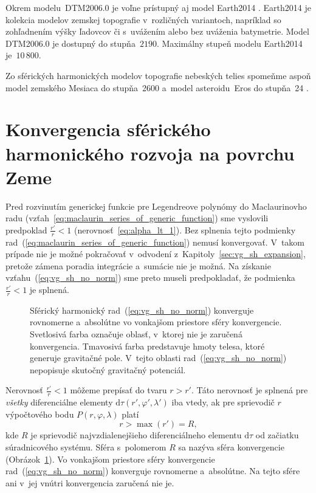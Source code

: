 \documentclass[a4paper, 12pt]{book}
\newcommand{\diff}{\mathrm d}
\begin{document}
Okrem modelu~DTM2006.0 je voľne prístupný aj model Earth2014 
\parencite{Hirt2015}.  Earth2014 je kolekcia modelov zemskej topografie 
v~rozličných variantoch, napríklad so zohľadnením výšky ľadovcov či s~uvážením 
alebo bez uváženia batymetrie.  Model DTM2006.0 je dostupný do stupňa~$2190$.  
Maximálny stupeň modelu Earth2014 je~$10\, 800$.

Zo sférických harmonických modelov topografie nebeských telies spomeňme aspoň 
model zemského Mesiaca do stupňa~2600 \parencite{Wieczorek2015} a~model 
asteroidu~Eros do stupňa~24 \parencite{Zuber2000}.






\section{Konvergencia sférického harmonického rozvoja na povrchu Zeme}
\label{sec:convergence_of_spherical_harmonics}

Pred rozvinutím generickej funkcie pre Legendreove polynómy do Maclaurinovho 
radu (vzťah~\ref{eq:maclaurin_series_of_generic_function}) sme vyslovili 
predpoklad $\frac{r'}{r} < 1$ (nerovnosť~\ref{eq:alpha_lt_1}).  Bez splnenia 
tejto podmienky rad~(\ref{eq:maclaurin_series_of_generic_function}) nemusí 
konvergovať.  V~takom prípade nie je možné pokračovať v~odvodení 
z~Kapitoly~\ref{sec:vg_sh_expansion}, pretože zámena poradia integrácie 
a~sumácie nie je možná.  Na získanie vzťahu~(\ref{eq:vg_sh_no_norm}) sme preto 
museli predpokladať, že podmienka $\frac{r'}{r} < 1$ je splnená.

\begin{figure}
\centering

\caption{Sférický harmonický rad~(\ref{eq:vg_sh_no_norm}) konverguje rovnomerne 
a~absolútne vo vonkajšom priestore sféry konvergencie.  Svetlosivá farba 
označuje oblasť, v~ktorej nie je zaručená konvergencia.  Tmavosivá farba 
predstavuje hmoty telesa, ktoré generuje gravitačné pole.  V~tejto oblasti 
rad~(\ref{eq:vg_sh_no_norm}) nepopisuje skutočný gravitačný potenciál.}
\label{fig:spherical_harmonics_convergence}
\end{figure}

Nerovnosť $\frac{r'}{r} < 1$ môžeme prepísať do tvaru $r > r'$.  Táto
nerovnosť je splnená pre \emph{všetky} diferenciálne elementy $\diff \tau(r',
\varphi', \lambda')$ iba vtedy, ak pre sprievodič $r$ výpočtového bodu $P(r,
\varphi, \lambda)$ platí
%
\begin{equation}
\label{eq:spherical_harmonic_convergence}
r > \max(r') = R{,}
\end{equation}
%
kde $R$ je sprievodič najvzdialenejšieho diferenciálneho elementu $\diff\tau$ 
od začiatku súradnicového systému.  Sféra s~polomerom $R$ sa nazýva sféra 
konvergencie \parencite{Hotine} 
(Obrázok~\ref{fig:spherical_harmonics_convergence}).  Vo vonkajšom priestore 
sféry konvergencie rad~(\ref{eq:vg_sh_no_norm}) konverguje rovnomerne 
a~absolútne.  Na tejto sfére ani v~jej vnútri konvergencia zaručená nie je.
\end{document}
